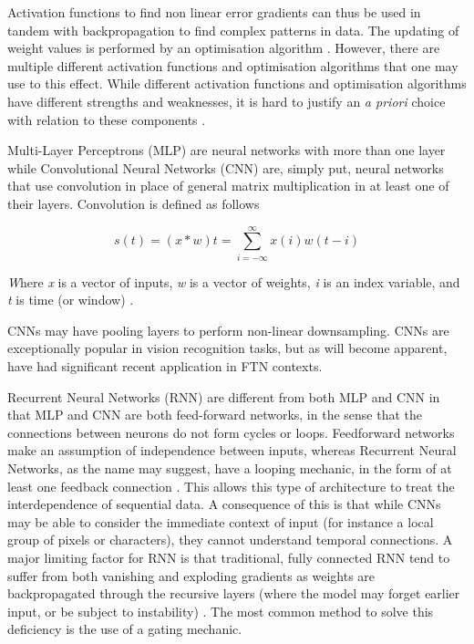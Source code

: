 Activation functions to find non linear error gradients can thus be used in tandem with backpropagation to find complex patterns in data. The updating of weight values is performed by an optimisation algorithm \cite{goodfellow2016deep}. However, there are multiple different activation functions and optimisation algorithms that one may use to this effect. While different activation functions and optimisation algorithms have different strengths and weaknesses, it is hard to justify an \textit{a priori} choice with relation to these components \cite{wolpert1997no}. 

Multi-Layer Perceptrons (MLP) are neural networks with more than one layer while Convolutional Neural Networks (CNN) are, simply put, neural networks that use convolution in place of general matrix multiplication in at least one of their layers. Convolution is defined as follows

\begin{equation}
s(t) = (x*w)t = \sum_{i=-\infty }^{\infty} x(i)w(t-i) 
\end{equation}

\textit{W}here \textit{x} is a vector of inputs, \textit{w} is a vector of weights, \textit{i} is an index variable, and \textit{t} is time (or window) \cite{goodfellow2016deep}.

CNNs may have pooling layers to perform non-linear downsampling. CNNs are exceptionally popular in vision recognition tasks, but as will become apparent, have had significant recent application in FTN contexts. 









Recurrent Neural Networks (RNN) are different from both MLP and CNN in that MLP and CNN are both feed-forward networks, in the sense that the connections
between neurons do not form cycles or loops. Feedforward networks make an assumption of independence between inputs, whereas Recurrent Neural Networks, as the name may suggest, have a looping mechanic, in the form of at least one feedback connection \cite{rumelhart1988learning}. This allows this type of architecture to treat the interdependence of sequential data. A consequence of this is that while CNNs may be able to consider the immediate context of input (for instance a local group of pixels or characters), they cannot understand temporal connections. A major limiting factor for RNN is that traditional, fully connected RNN tend to suffer from both vanishing and exploding gradients as weights are backpropagated through the recursive layers (where the model may forget earlier input, or be subject to instability) \cite{goodfellow2016deep}. The most common method to solve this deficiency is the use of a gating mechanic. 











